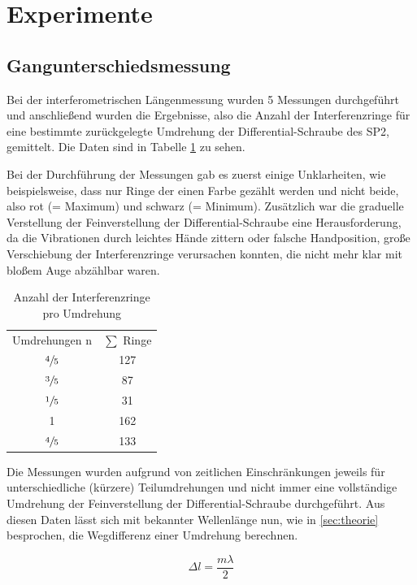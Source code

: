 \documentclass[
  headings=optiontotocandhead,
  twoside,
  openright,
  numbers=noenddot,
  toc=flat,
  11pt,
  parskip=full,
  listof=flat,
  bibliography=totoc,
  a4paper,
  DIV=14,
  BCOR=22mm,
  headheight=5mm,
  headinclude=true,
]{scrartcl}
\begin{document}
\section{Experimente}

\subsection{Gangunterschiedsmessung} \label{laser_messung}

Bei der interferometrischen Längenmessung wurden 5 Messungen durchgeführt und anschließend wurden die Ergebnisse, also die Anzahl der Interferenzringe für eine bestimmte zurückgelegte Umdrehung der Differential-Schraube des SP2, gemittelt. Die Daten sind in Tabelle \ref{tab:lasermessung} zu sehen.

Bei der Durchführung der Messungen gab es zuerst einige Unklarheiten, wie beispielsweise, dass nur Ringe der einen Farbe gezählt werden und nicht beide, also rot (= Maximum) und schwarz (= Minimum). Zusätzlich war die graduelle Verstellung der Feinverstellung der Differential-Schraube eine Herausforderung, da die Vibrationen durch leichtes Hände zittern oder falsche Handposition, große Verschiebung der Interferenzringe verursachen konnten, die nicht mehr klar mit bloßem Auge abzählbar waren.

\begin{table}[htbp]
\centering
\setlength{\tabcolsep}{10pt}
\begin{tabular}{ |c|c| }
  \multicolumn{1}{c}{Umdrehungen n}  & \multicolumn{1}{c}{$\sum$ Ringe} \\
  $\sfrac{4}{5}$ & 127 \\
  $\sfrac{3}{5}$ & 87 \\
  $\sfrac{1}{5}$ & 31 \\
  1 & 162 \\
  $\sfrac{4}{5}$ & 133 \\
\end{tabular}
\caption{Anzahl der Interferenzringe pro Umdrehung}
\label{tab:lasermessung}
\end{table}

Die Messungen wurden aufgrund von zeitlichen Einschränkungen jeweils für unterschiedliche (kürzere) Teilumdrehungen und nicht immer eine vollständige Umdrehung der Feinverstellung der Differential-Schraube durchgeführt. Aus diesen Daten lässt sich mit bekannter Wellenlänge nun, wie in \ref{sec:theorie} besprochen, die Wegdifferenz einer Umdrehung berechnen.

\begin{equation}
 \Delta l = \frac{m \lambda}{2} 
 \label{eq:4.1.1}
\end{equation}
\end{document}
